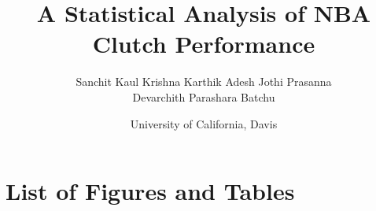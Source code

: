 \documentclass[12pt]{article}
\begin{document}
\title{\textbf{A Statistical Analysis of NBA Clutch Performance}}

\author{
    Sanchit Kaul \quad Krishna Karthik \quad Adesh Jothi Prasanna \\[4pt]
    Devarchith Parashara Batchu
}

\date{University of California, Davis}

\maketitle
\thispagestyle{plain}



\begin{abstract}

\end{abstract}






\newpage
\section{List of Figures and Tables}
\end{document}
